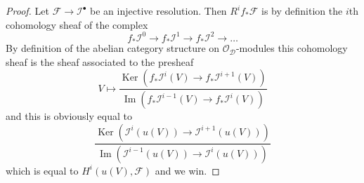\documentclass[10pt,a4paper]{amsart}
\theoremstyle{plain}
\theoremstyle{definition}
\theoremstyle{remark}
\numberwithin{equation}{subsection}
\def\Ker{\mathop{\mathrm{Ker}}}
\def\Im{\mathop{\mathrm{Im}}}
\begin{document}
\begin{proof}
Let $\mathcal{F} \to \mathcal{I}^\bullet$ be an injective resolution.
Then $R^if_*\mathcal{F}$ is by definition the $i$th cohomology sheaf
of the complex
$$
f_*\mathcal{I}^0 \to f_*\mathcal{I}^1 \to f_*\mathcal{I}^2 \to \ldots
$$
By definition of the abelian category structure on
$\mathcal{O}_\mathcal{D}$-modules
this cohomology sheaf is the sheaf associated to the presheaf
$$
V
\longmapsto
\frac{\Ker(f_*\mathcal{I}^i(V) \to f_*\mathcal{I}^{i + 1}(V))}
{\Im(f_*\mathcal{I}^{i - 1}(V) \to f_*\mathcal{I}^i(V))}
$$
and this is obviously equal to
$$
\frac{\Ker(\mathcal{I}^i(u(V)) \to \mathcal{I}^{i + 1}(u(V)))}
{\Im(\mathcal{I}^{i - 1}(u(V)) \to \mathcal{I}^i(u(V)))}
$$
which is equal to $H^i(u(V), \mathcal{F})$
and we win.
\end{proof}
\end{document}

